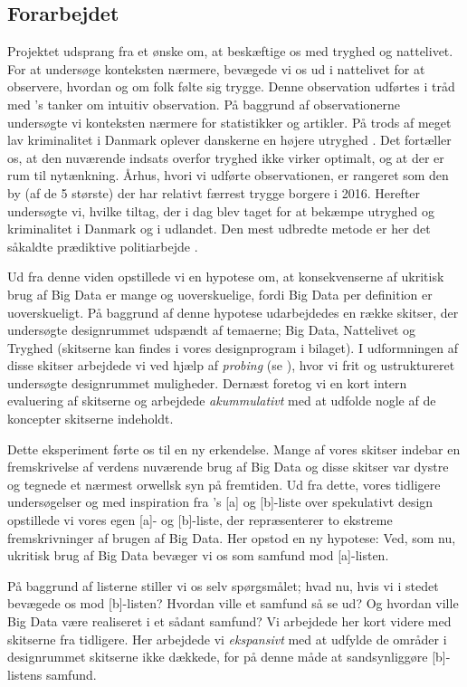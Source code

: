 \subsection*{Forarbejdet}
Projektet udsprang fra et ønske om, at beskæftige os med tryghed og nattelivet. For at undersøge konteksten nærmere, bevægede vi os ud i nattelivet for at observere, hvordan og om folk følte sig trygge. Denne observation udførtes i tråd med \cite[]{suri2005thoughtless}'s tanker om intuitiv observation. På baggrund af observationerne undersøgte vi konteksten nærmere for statistikker og artikler. På trods af meget lav kriminalitet i Danmark\cite[]{LavKrim} oplever danskerne en højere utryghed \cite[]{HoejUtryghed}. Det fortæller os, at den  nuværende indsats overfor tryghed ikke virker optimalt, og at der er rum til nytænkning. Århus, hvori vi udførte observationen, er rangeret som den by (af de 5 største) der har relativt færrest trygge borgere i 2016\cite[]{KrimStat}.
Herefter undersøgte vi, hvilke tiltag, der i dag blev taget for at bekæmpe utryghed og kriminalitet i Danmark og i udlandet. Den mest udbredte metode er her det såkaldte prædiktive politiarbejde \cite[]{PredPol,CityPulse, PolIntel}.

Ud fra denne viden opstillede vi en hypotese om, at konsekvenserne af ukritisk brug af Big Data er mange og uoverskuelige, fordi Big Data per definition er uoverskueligt. På baggrund af denne hypotese udarbejdedes en række skitser, der undersøgte designrummet udspændt af temaerne; Big Data, Nattelivet og Tryghed (skitserne kan findes i vores designprogram i bilaget). I udformningen af disse skitser arbejdede vi ved hjælp af \textit{probing} (se \cite[]{krogh2015ways}), hvor vi frit og ustruktureret undersøgte designrummet muligheder. Dernæst foretog vi en kort intern evaluering af skitserne og arbejdede \textit{akummulativt} med at udfolde nogle af de koncepter skitserne indeholdt.

Dette eksperiment førte os til en ny erkendelse. Mange af vores skitser indebar en fremskrivelse af verdens nuværende brug af Big Data og disse skitser var dystre og tegnede et nærmest orwellsk syn på fremtiden. Ud fra dette, vores tidligere undersøgelser og med inspiration fra \cite[]{Dunne:2013:SED:2613526}'s [a] og [b]-liste over spekulativt design opstillede vi vores egen [a]- og [b]-liste, der repræsenterer to ekstreme fremskrivninger af brugen af Big Data. Her opstod en ny hypotese: Ved, som nu, ukritisk brug af Big Data bevæger vi os som samfund mod [a]-listen.

På baggrund af listerne stiller vi os selv spørgsmålet; hvad nu, hvis vi i stedet bevægede os mod [b]-listen? Hvordan ville et samfund så se ud? Og hvordan ville Big Data være realiseret i et sådant samfund? Vi arbejdede her kort videre med skitserne fra tidligere. Her arbejdede vi \textit{ekspansivt} med at udfylde de områder i designrummet skitserne ikke dækkede, for på denne måde at sandsynliggøre [b]-listens samfund.

